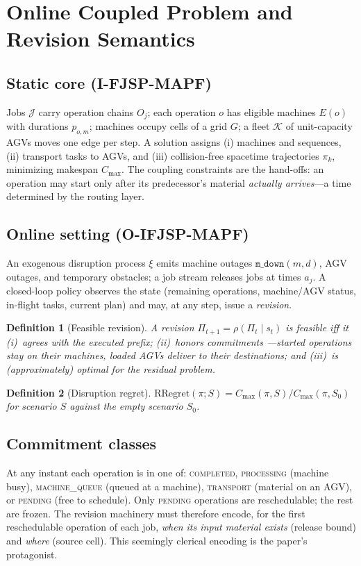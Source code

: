 \documentclass[twocolumn]{article}
\newtheorem{definition}{Definition}
\newcommand{\cmax}{C_{\max}}
\begin{document}
\section{Online Coupled Problem and Revision Semantics}
\label{sec:formulation}
\subsection{Static core (I-FJSP-MAPF)}
Jobs $\mathcal{J}$ carry operation chains $O_j$; each operation $o$ has
eligible machines $E(o)$ with durations $p_{o,m}$; machines occupy cells
of a grid $G$; a fleet $\mathcal{K}$ of unit-capacity AGVs moves one edge
per step. A solution assigns (i) machines and sequences, (ii) transport
tasks to AGVs, and (iii) collision-free spacetime trajectories
$\pi_k$, minimizing makespan $\cmax$. The coupling constraints are the
hand-offs: an operation may start only after its predecessor's material
\emph{actually arrives}---a time determined by the routing layer.

\subsection{Online setting (O-IFJSP-MAPF)}
An exogenous disruption process $\xi$ emits machine outages
$\texttt{m\_down}(m,d)$, AGV outages, and temporary obstacles; a job
stream releases jobs at times $a_j$. A closed-loop policy observes the
state (remaining operations, machine/AGV status, in-flight tasks, current
plan) and may, at any step, issue a \emph{revision}.

\begin{definition}[Feasible revision]
A revision $\Pi_{t+1}=\rho(\Pi_t\mid s_t)$ is feasible iff it
(i)~agrees with the executed prefix; (ii)~honors \emph{commitments}
---started operations stay on their machines, loaded AGVs deliver to
their destinations; and (iii)~is (approximately) optimal for the residual
problem.
\end{definition}

\begin{definition}[Disruption regret]
$\mathrm{RRegret}(\pi;S)=\cmax(\pi,S)/\cmax(\pi,S_0)$ for scenario $S$
against the empty scenario $S_0$.
\end{definition}

\subsection{Commitment classes}
At any instant each operation is in one of:
\textsc{completed}, \textsc{processing} (machine busy),
\textsc{machine\_queue} (queued at a machine), \textsc{transport}
(material on an AGV), or \textsc{pending} (free to schedule).
Only \textsc{pending} operations are reschedulable; the rest are frozen.
The revision machinery must therefore encode, for the first reschedulable
operation of each job, \emph{when its input material exists} (release
bound) and \emph{where} (source cell). This seemingly clerical encoding
is the paper's protagonist.
\end{document}
